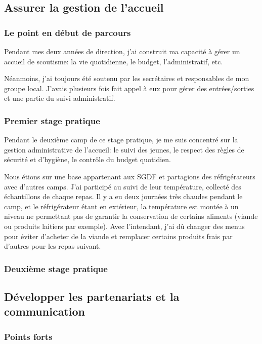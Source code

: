 \documentclass[titlepage,11pt,a4paper]{article}
\begin{document}
\subsection{Assurer la gestion de l'accueil}

\subsubsection{Le point en début de parcours}

Pendant mes deux années de direction, j'ai construit ma capacité à gérer un accueil de
scoutisme: la vie quotidienne, le budget, l'administratif, etc.

Néanmoins, j'ai toujours été soutenu par les secrétaires et responsables de mon groupe
local. J'avais plusieurs fois fait appel à eux pour gérer des entrées/sorties et une
partie du suivi administratif.

\subsubsection{Premier stage pratique}

Pendant le deuxième camp de ce stage pratique, je me suis concentré sur la gestion
administrative de l'accueil: le suivi des jeunes, le respect des règles de sécurité et
d'hygiène, le contrôle du budget quotidien.

Nous étions sur une base appartenant aux SGDF et partagions des réfrigérateurs avec
d'autres camps. J'ai participé au suivi de leur température, collecté des échantillons de
chaque repas. Il y a eu deux journées très chaudes pendant le camp, et le réfrigérateur
étant en extérieur, la température est montée à un niveau ne permettant pas de garantir la
conservation de certains aliments (viande ou produits laitiers par exemple). Avec l'intendant, j'ai dû
changer des menus pour éviter d'acheter de la viande et remplacer certains produits frais
par d'autres pour les repas suivant.

\subsubsection{Deuxième stage pratique}



\subsection{Développer les partenariats et la communication}
\subsubsection{Points forts}
\end{document}
